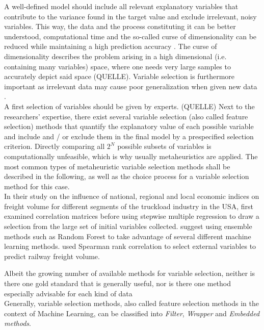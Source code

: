 \documentclass[a4paper, 11pt]{article}
\begin{document}
A well-defined model should include all relevant explanatory variables that contribute to the variance found in the target value and exclude irrelevant, noisy variables. This way, the data and the process constituting it can be better understood, computational time and the so-called curse of dimensionality can be reduced while maintaining a high prediction accuracy \citep{Chandrashekar.2014}. The curse of dimensionality describes the problem arising in a high dimensional (i.e. containing many variables) space, where one needs very large samples to accurately depict said space (QUELLE). Variable selection is furthermore important as irrelevant data may cause poor generalization when given new data \citep{Chandrashekar.2014}.
\\
A first selection of variables should be given by experts. (QUELLE)
Next to the researchers' expertise, there exist several variable selection (also called feature selection) methods that quantify the explanatory value of each possible variable and include and / or exclude them in the final model by a prespecified selection criterion.
Directly comparing all $2^N$ possible subsets of variables is computationally unfeasible, which is why usually metaheuristics are applied. The most common types of metaheuristic variable selection methods shall be described in the following, as well as the choice process for a variable selection method for this case.
\\
In their study on the influence of national, regional and local economic indices on freight volume for different segments of the truckload industry in the USA, \cite{Fite.2002} first examined correlation matrices before using stepwise multiple regression to draw a selection from the large set of initial variables collected. 
\cite{Taghizadeh.2017} suggest using ensemble methods such as Random Forest to take advantage of several different machine learning methods.
\cite{Feng.2018} used Spearman rank correlation to select external variables to predict railway freight volume.


Albeit the growing number of available methods for variable selection, neither is there one gold standard that is generally useful, nor is there one method especially advisable for each kind of data \citep{Taghizadeh.2017}\\

Generally, variable selection methods, also called feature selection methods in the context of Machine Learning, can be classified into \textit{Filter}, \textit{Wrapper} and \textit{Embedded methods}. 




\end{document}
